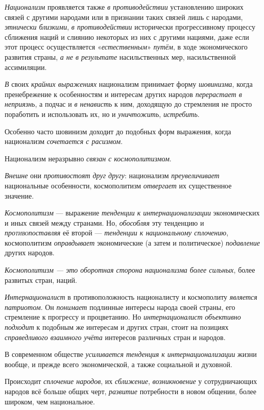 \documentclass[a4paper,14pt,russian]{extreport}
\begin{document}
\emph{Национализм} проявляется также \emph{в противодействии} установлению широких связей с другими народами или в признании таких связей лишь с народами, \emph{этнически близкими}, \emph{в противодействии} исторически прогрессивному процессу сближения наций и слиянию некоторых из них с другими нациями, даже если этот процесс осуществляется «\emph{естественным}» \emph{путём}, в ходе экономического развития страны, \emph{а не в результате} насильственных мер, насильственной ассимиляции.

\emph{В} своих \emph{крайних выражениях} национализм принимает форму \emph{шовинизма}, когда пренебрежение к особенностям и интересам других народов \emph{перерастает в неприязнь}, а подчас и \emph{в ненависть} к ним, доходящую до стремления не просто поработить и использовать их, но и \emph{уничтожить}, \emph{истребить}.

Особенно часто шовинизм доходит до подобных форм выражения, когда национализм \emph{сочетается с расизмом}.

Национализм неразрывно \emph{связан с космополитизмом}.

\emph{Внешне} они \emph{противостоят друг другу}: национализм \emph{преувеличивает} национальные особенности, космополитизм \emph{отвергает} их существенное значение.

\emph{Космополитизм} --- выражение \emph{тенденции к интернационализации} экономических и иных связей между странами. Но, \emph{обособляя} эту тенденцию и \emph{про\textsc{тиво}поставляя} её второй --- \emph{тенденции к национальному сплочению}, космополитизм \emph{оправдывает} экономические (а затем и политическое) \emph{подавление} других народов.

\emph{Космополитизм --- это оборотная сторона национализма более сильных}, более развитых стран, наций.

\emph{Интернационалист} в противоположность националисту и космополиту \emph{является патриотом}. Он \emph{понимает} подлинные интересы народа своей страны, его стремление к прогрессу и процветанию. Но \emph{интернационалист} \emph{объективно подходит} к подобным же интересам и других стран, стоит на позициях \emph{справедливого взаимного учёта} интересов различных стран и народов.

В современном обществе \emph{усиливается тенденция к интернационализации} жизни вообще, и прежде всего экономической, а также социальной и духовной.

Происходит \emph{сплочение народов}, их \emph{сближение}, \emph{возникновение} у сотрудничающих народов всё больше общих черт, \emph{развитие} потребности в новом общении, более широком, чем национальное.
\end{document}
